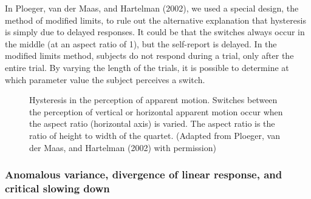 \documentclass[
  a4paper,
  DIV=11,
  numbers=noendperiod,
  oneside]{scrreprt}
\begin{document}
In Ploeger, van der Maas, and Hartelman (2002), we used a special
design, the method of modified limits, to rule out the alternative
explanation that hysteresis is simply due to delayed responses. It could
be that the switches always occur in the middle (at an aspect ratio of
1), but the self-report is delayed. In the modified limits method,
subjects do not respond during a trial, only after the entire trial. By
varying the length of the trials, it is possible to determine at which
parameter value the subject perceives a switch.

\begin{figure}


\caption{\label{fig-ch3-img22-old-34}Hysteresis in the perception of
apparent motion. Switches between the perception of vertical or
horizontal apparent motion occur when the aspect ratio (horizontal axis)
is varied. The aspect ratio is the ratio of height to width of the
quartet. (Adapted from Ploeger, van der Maas, and Hartelman (2002) with
permission)}

\end{figure}%

\subsubsection{Anomalous variance, divergence of linear response, and
critical slowing
down}\label{sec-Anomalous-variance-divergence-of-linear-response-and-critical-slowing-down}
\end{document}
